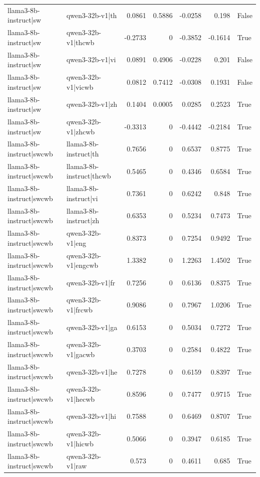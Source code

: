 \begin{table}
\begin{tabular}{l l r r r r l}
llama3-8b-instruct|sw & qwen3-32b-v1|th & 0.0861 & 0.5886 & -0.0258 & 0.198 & False \\
llama3-8b-instruct|sw & qwen3-32b-v1|thcwb & -0.2733 & 0 & -0.3852 & -0.1614 & True \\
llama3-8b-instruct|sw & qwen3-32b-v1|vi & 0.0891 & 0.4906 & -0.0228 & 0.201 & False \\
llama3-8b-instruct|sw & qwen3-32b-v1|vicwb & 0.0812 & 0.7412 & -0.0308 & 0.1931 & False \\
llama3-8b-instruct|sw & qwen3-32b-v1|zh & 0.1404 & 0.0005 & 0.0285 & 0.2523 & True \\
llama3-8b-instruct|sw & qwen3-32b-v1|zhcwb & -0.3313 & 0 & -0.4442 & -0.2184 & True \\
llama3-8b-instruct|swcwb & llama3-8b-instruct|th & 0.7656 & 0 & 0.6537 & 0.8775 & True \\
llama3-8b-instruct|swcwb & llama3-8b-instruct|thcwb & 0.5465 & 0 & 0.4346 & 0.6584 & True \\
llama3-8b-instruct|swcwb & llama3-8b-instruct|vi & 0.7361 & 0 & 0.6242 & 0.848 & True \\
llama3-8b-instruct|swcwb & llama3-8b-instruct|zh & 0.6353 & 0 & 0.5234 & 0.7473 & True \\
llama3-8b-instruct|swcwb & qwen3-32b-v1|eng & 0.8373 & 0 & 0.7254 & 0.9492 & True \\
llama3-8b-instruct|swcwb & qwen3-32b-v1|engcwb & 1.3382 & 0 & 1.2263 & 1.4502 & True \\
llama3-8b-instruct|swcwb & qwen3-32b-v1|fr & 0.7256 & 0 & 0.6136 & 0.8375 & True \\
llama3-8b-instruct|swcwb & qwen3-32b-v1|frcwb & 0.9086 & 0 & 0.7967 & 1.0206 & True \\
llama3-8b-instruct|swcwb & qwen3-32b-v1|ga & 0.6153 & 0 & 0.5034 & 0.7272 & True \\
llama3-8b-instruct|swcwb & qwen3-32b-v1|gacwb & 0.3703 & 0 & 0.2584 & 0.4822 & True \\
llama3-8b-instruct|swcwb & qwen3-32b-v1|he & 0.7278 & 0 & 0.6159 & 0.8397 & True \\
llama3-8b-instruct|swcwb & qwen3-32b-v1|hecwb & 0.8596 & 0 & 0.7477 & 0.9715 & True \\
llama3-8b-instruct|swcwb & qwen3-32b-v1|hi & 0.7588 & 0 & 0.6469 & 0.8707 & True \\
llama3-8b-instruct|swcwb & qwen3-32b-v1|hicwb & 0.5066 & 0 & 0.3947 & 0.6185 & True \\
llama3-8b-instruct|swcwb & qwen3-32b-v1|raw & 0.573 & 0 & 0.4611 & 0.685 & True \\

\end{tabular}
\end{table}
